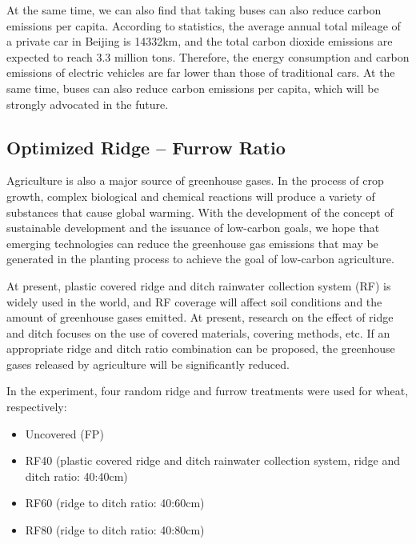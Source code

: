 \documentclass{apmcmthesis}
\begin{document}
At the same time, we can also find that taking buses can also reduce carbon emissions per capita. According to statistics, the average annual total mileage of a private car in Beijing is 14332km\cite{112}, and the total carbon dioxide emissions are expected to reach 3.3 million tons. Therefore, the energy consumption and carbon emissions of electric vehicles are far lower than those of traditional cars. At the same time, buses can also reduce carbon emissions per capita, which will be strongly advocated in the future.

\subsection{Optimized Ridge – Furrow Ratio}
Agriculture is also a major source of greenhouse gases. In the process of crop growth, complex biological and chemical reactions will produce a variety of substances that cause global warming. With the development of the concept of sustainable development and the issuance of low-carbon goals, we hope that emerging technologies can reduce the greenhouse gas emissions that may be generated in the planting process to achieve the goal of low-carbon agriculture.

At present, plastic covered ridge and ditch rainwater collection system (RF) is widely used in the world, and RF coverage will affect soil conditions and the amount of greenhouse gases emitted. At present, research on the effect of ridge and ditch focuses on the use of covered materials, covering methods, etc. If an appropriate ridge and ditch ratio combination can be proposed, the greenhouse gases released by agriculture will be significantly reduced.

In the experiment, four random ridge and furrow treatments were used for wheat, respectively:

\begin{itemize}
  \item Uncovered (FP)
  \item RF40 (plastic covered ridge and ditch rainwater collection system, ridge and ditch ratio: 40:40cm)
  \item RF60 (ridge to ditch ratio: 40:60cm)
  \item RF80 (ridge to ditch ratio: 40:80cm)
\end{itemize}
\end{document}
